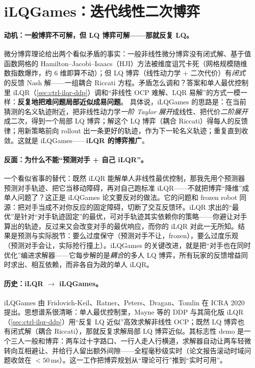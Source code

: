 \section{iLQGames：迭代线性二次博弈}
\label{sec:rtg-ilqgames}

\paragraph{动机：一般博弈不可解，但 LQ 博弈可解——那就反复 LQ。}
微分博弈理论给出两个看似矛盾的事实：一般非线性微分博弈没有闭式解、基于值函数网格的 Hamilton--Jacobi--Isaacs（HJI）方法被维度诅咒卡死（网格规模随维数指数爆炸，约 $6$ 维即算不动）；但 LQ 博弈（线性动力学 + 二次代价）有\emph{闭式}的反馈 Nash 解——一组耦合 Riccati 方程。矛盾怎么调和？答案和单人最优控制里 iLQR（\cref{sec:ctrl-ilqr-ddp}）调和“非线性 OCP 难解、LQR 易解”的方式一模一样：\textbf{反复地把难问题局部近似成易问题}。
具体说，iLQGames 的思路是：在当前猜测的名义轨迹附近，把非线性动力学\emph{一阶 Taylor 展开}成线性、把代价\emph{二阶展开}成二次，得到一个局部 LQ 博弈；解这个 LQ 博弈（耦合 Riccati）得每人的反馈律；用新策略前向 rollout 出一条更好的轨迹，作为下一轮名义轨迹；重复直到收敛。这就是 iLQGames——\textbf{iLQR 的博弈推广}。

\paragraph{反面：为什么不能“预测对手 + 自己 iLQR”。}
一个看似省事的替代：既然 iLQR 能解单人非线性最优控制，那我先用个预测器预测对手轨迹、把它当移动障碍，再对自己跑标准 iLQR——不就把博弈“降维”成单人问题了？这正是 iLQGames 论文要反对的做法\cite{fridovich2020efficient}。它的问题和 frozen robot 同源：把对手当成不对你反应的固定障碍，切断了交互反馈环。iLQR 求出的“最优”是针对“对手轨迹固定”的最优，可对手轨迹其实依赖你的策略——你避让对手算出的轨迹，反过来又会改变对手的最优响应，而你的 iLQR 对此一无所知。结果是预测与实际脱节：要么过度保守（预测对手不让，frozen），要么过度乐观（预测对手会让，实际抢行撞上）。iLQGames 的关键改进，就是把“对手也在同时优化”编进求解器——它每步解的是\emph{耦合}的多人 LQ 博弈，所有玩家的反馈增益同时求出、相互依赖，而非各自为政的单人 iLQR。

\paragraph{历史：iLQR $\to$ iLQGames。}
iLQGames 由 Fridovich-Keil、Ratner、Peters、Dragan、Tomlin 在 ICRA 2020 提出\cite{fridovich2020efficient}。思想谱系很清晰：单人最优控制里，Mayne 等的 DDP 与其简化版 iLQR（\cref{sec:ctrl-ilqr-ddp}）用“反复 LQ 近似”高效求解非线性 OCP；既然 LQ 博弈也有闭式解（耦合 Riccati），那就反复求解局部 LQ 博弈近似。其标志性 demo 是一个三人一般和博弈：两车过十字路口、一行人走人行横道，求解器自动让两车轻微转向互相避让、并给行人留出额外间隙——全程毫秒级实时（论文报告滚动时域问题收敛在 $<50$\,ms）\cite{fridovich2020efficient}。这一工作把博弈规划从“理论可行”推到“实时可用”。

